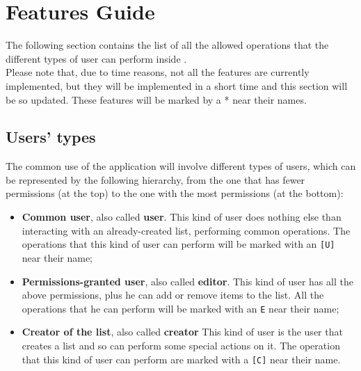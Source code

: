 \section{Features Guide}
The following section contains the list of all the allowed operations that the different types of user can perform inside \app. \\
Please note that, due to time reasons, not all the features are currently implemented, but they will be implemented in a short time and this section will be so updated. These features will be marked by a * near their names.

\subsection{Users' types}
The common use of the application will involve different types of users, which can be represented by the following hierarchy, from the one that has fewer permissions (at the top) to the one with the most permissions (at the bottom):
\begin{itemize}
	\item \textbf{Common user}, also called \textbf{user}.
		  This kind of user does nothing else than interacting with an already-created list, performing common operations. The operations that this kind of user can perform will be marked with an \texttt{[U]} near their name;
	\item \textbf{Permissions-granted user}, also called \textbf{editor}.
		  This kind of user has all the above permissions, plus he can add or remove items to the list. All the operations that he can perform will be marked with an \texttt{E} near their name;
	\item \textbf{Creator of the list}, also called \textbf{creator}
		  This kind of user is the user that creates a list and so can perform some special actions on it. The operation that this kind of user can perform are marked with a \texttt{[C]} near their name.
\end{itemize}













